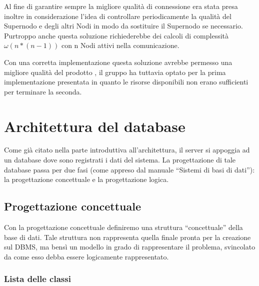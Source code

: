 Al fine di garantire sempre la migliore qualità di connessione era stata presa inoltre in considerazione l'idea di controllare periodicamente la qualità del Supernodo e degli altri Nodi in modo da sostituire il Supernodo se necessario. Purtroppo anche questa soluzione richiederebbe dei calcoli di complessità $\omega(n*(n-1))$ con n Nodi attivi nella comunicazione.

Con una corretta implementazione questa soluzione avrebbe permesso una migliore qualità del prodotto \caName, il gruppo ha tuttavia optato per la prima implementazione presentata in quanto le risorse disponibili non erano sufficienti per terminare la seconda.
\clearpage

\section{Architettura del database}\label{sec:database}

Come già citato nella parte introduttiva all'architettura, il server si appoggia ad un database dove sono registrati i dati del sistema. La progettazione di tale database passa per due fasi (come appreso dal manuale ``Sistemi di basi di dati''): la progettazione concettuale e la progettazione logica.

\subsection{Progettazione concettuale}
Con la progettazione concettuale definiremo una struttura ``concettuale'' della base di dati. Tale struttura non rappresenta quella finale pronta per la creazione sul DBMS, ma bensì un modello in grado di rappresentare il problema, svincolato da come esso debba essere logicamente rappresentato.

\subsubsection{Lista delle classi}

